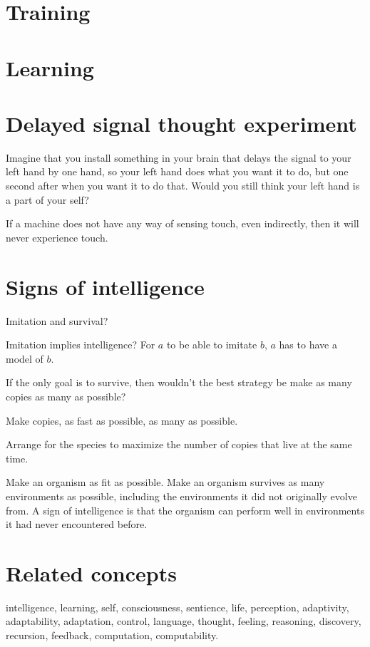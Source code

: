 \section{Training}

\section{Learning}

\section{Delayed signal thought experiment}

Imagine that you install something in your brain that delays the signal to your left hand by one hand,
so your left hand does what you want it to do, but one second after when you want it to do that.
Would you still think your left hand is a part of your self?

If a machine does not have any way of sensing touch, even indirectly,
then it will never experience touch.

\section{Signs of intelligence}

Imitation and survival?

Imitation implies intelligence?
For \(a\) to be able to imitate \(b\),
\(a\) has to have a model of \(b\).

If the only goal is to survive, then wouldn't the best strategy be
make as many copies as many as possible?

Make copies, as fast as possible, as many as possible.

Arrange for the species to maximize the number of copies that live at the same time.

Make an organism as fit as possible.
Make an organism survives as many environments as possible,
including the environments it did not originally evolve from.
A sign of intelligence is that the organism can
perform well in environments it had never encountered before.

\section{Related concepts}

intelligence, learning, self, consciousness, sentience, life, perception,
adaptivity, adaptability, adaptation, control, language, thought, feeling, reasoning, discovery,
recursion, feedback, computation, computability.

